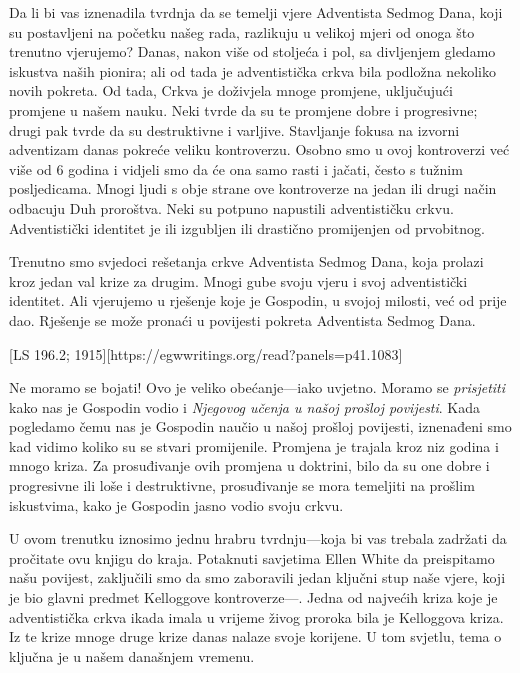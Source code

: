 Da li bi vas iznenadila tvrdnja da se temelji vjere Adventista Sedmog Dana, koji su postavljeni na početku našeg rada, razlikuju u velikoj mjeri od onoga što trenutno vjerujemo? Danas, nakon više od stoljeća i pol, sa divljenjem gledamo iskustva naših pionira; ali od tada je adventistička crkva bila podložna nekoliko novih pokreta. Od tada, Crkva je doživjela mnoge promjene, uključujući promjene u našem nauku. Neki tvrde da su te promjene dobre i progresivne; drugi pak tvrde da su destruktivne i varljive. Stavljanje fokusa na izvorni adventizam danas pokreće veliku kontroverzu. Osobno smo u ovoj kontroverzi već više od 6 godina i vidjeli smo da će ona samo rasti i jačati, često s tužnim posljedicama. Mnogi ljudi s obje strane ove kontroverze na jedan ili drugi način odbacuju Duh proroštva. Neki su potpuno napustili adventističku crkvu. Adventistički identitet je ili izgubljen ili drastično promijenjen od prvobitnog.

Trenutno smo svjedoci rešetanja crkve Adventista Sedmog Dana, koja prolazi kroz jedan val krize za drugim. Mnogi gube svoju vjeru i svoj adventistički identitet. Ali vjerujemo u rješenje koje je Gospodin, u svojoj milosti, već od prije dao. Rješenje se može pronaći u povijesti pokreta Adventista Sedmog Dana.

[LS 196.2; 1915][https://egwwritings.org/read?panels=p41.1083]

Ne moramo se bojati! Ovo je veliko obećanje—iako uvjetno. Moramo se \textit{prisjetiti} kako nas je Gospodin vodio i \textit{Njegovog učenja u našoj prošloj povijesti}. Kada pogledamo čemu nas je Gospodin naučio u našoj prošloj povijesti, iznenađeni smo kad vidimo koliko su se stvari promijenile. Promjena je trajala kroz niz godina i mnogo kriza. Za prosuđivanje ovih promjena u doktrini, bilo da su one dobre i progresivne ili loše i destruktivne, prosuđivanje se mora temeljiti na prošlim iskustvima, kako je Gospodin jasno vodio svoju crkvu.

U ovom trenutku iznosimo jednu hrabru tvrdnju—koja bi vas trebala zadržati da pročitate ovu knjigu do kraja. Potaknuti savjetima Ellen White da preispitamo našu povijest, zaključili smo da smo zaboravili jedan ključni stup naše vjere, koji je bio glavni predmet Kelloggove kontroverze—. Jedna od najvećih kriza koje je adventistička crkva ikada imala u vrijeme živog proroka bila je Kelloggova kriza. Iz te krize mnoge druge krize danas nalaze svoje korijene. U tom svjetlu, tema o  ključna je u našem današnjem vremenu.

